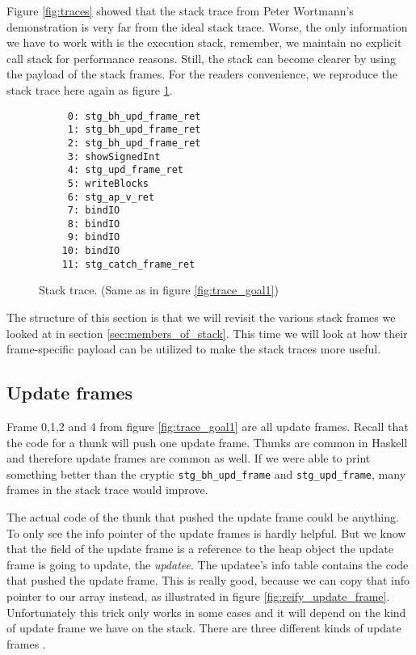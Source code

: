 Figure \ref{fig:traces} showed that the stack trace from Peter Wortmann's
demonstration is very far from the ideal stack trace.  Worse, the only
information we have to work with is the execution stack, remember, we maintain no
explicit call stack for performance reasons. Still, the stack can become
clearer by using the payload of the stack frames. For the readers convenience,
we reproduce the stack trace here again as figure \ref{fig:traces_2}.

\begin{figure}
\begin{mdframed}
  \begin{verbatim}
     0: stg_bh_upd_frame_ret
     1: stg_bh_upd_frame_ret
     2: stg_bh_upd_frame_ret
     3: showSignedInt
     4: stg_upd_frame_ret
     5: writeBlocks
     6: stg_ap_v_ret
     7: bindIO
     8: bindIO
     9: bindIO
    10: bindIO
    11: stg_catch_frame_ret
  \end{verbatim}
        \caption{Stack trace. (Same as in figure \ref{fig:trace_goal1})}\label{fig:traces_2}
\end{mdframed}
\end{figure}

The structure of this section is that we will revisit the various
stack frames we looked at in section \ref{sec:members_of_stack}. This
time we will look at how their frame-specific payload can be utilized to make
the stack traces more useful.

\subsection{Update frames} \label{sec:update_frames}

Frame 0,1,2 and 4 from figure \ref{fig:trace_goal1} are all update
frames. Recall that the code for a thunk will push one update
frame. Thunks are common in Haskell and therefore update frames are common
as well. If we were able to print something better
than the cryptic \texttt{stg\_bh\_upd\_frame} and \texttt{stg\_upd\_frame},
many frames in the stack trace would improve.

The actual code of the thunk that pushed the update frame
could be anything. To only see the info pointer of the update frames is hardly helpful.
But we know that the field of the update frame is a reference to the
heap object the update frame is going to update, the \emph{updatee}. The updatee's
info table contains the code that pushed the update frame.
This is really good, because we can copy that info pointer to our array instead,
as illustrated in figure \ref{fig:reify_update_frame}.
Unfortunately this trick only works in some cases and it will depend on the kind of
update frame we have on the stack. There are three different kinds of
update frames \cite{github_updates_cmm}.


